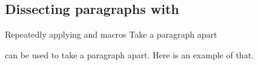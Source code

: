 \documentclass{book}
\begin{document}
\subsection{Dissecting paragraphs with }
\label{varioset}

Repeatedly applying  and  macros
\howto Take a paragraph apart\par
can be used to take a paragraph apart.
Here is an example of that.
\end{document}
